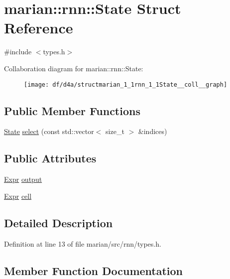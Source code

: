 \hypertarget{structmarian_1_1rnn_1_1State}{}\section{marian\+:\+:rnn\+:\+:State Struct Reference}
\label{structmarian_1_1rnn_1_1State}


{\ttfamily \#include $<$types.\+h$>$}



Collaboration diagram for marian\+:\+:rnn\+:\+:State\+:
\nopagebreak
\begin{figure}[H]
\begin{center}
\leavevmode
\texttt{[image: df/d4a/structmarian\_1\_1rnn\_1\_1State\_\_coll\_\_graph]}
\end{center}
\end{figure}
\subsection*{Public Member Functions}
\begin{DoxyCompactItemize}
\item 
\hyperlink{structmarian_1_1rnn_1_1State}{State} \hyperlink{structmarian_1_1rnn_1_1State_a8ec95a2be079d859761e58cb46c4d6c8}{select} (const std\+::vector$<$ size\+\_\+t $>$ \&indices)
\end{DoxyCompactItemize}
\subsection*{Public Attributes}
\begin{DoxyCompactItemize}
\item 
\hyperlink{namespacemarian_a498d8baf75b754011078b890b39c8e12}{Expr} \hyperlink{structmarian_1_1rnn_1_1State_a299c1c1383dbccf829d7768d046fee83}{output}
\item 
\hyperlink{namespacemarian_a498d8baf75b754011078b890b39c8e12}{Expr} \hyperlink{structmarian_1_1rnn_1_1State_a4afb5d8340bcb9afd2a5de80b2771aba}{cell}
\end{DoxyCompactItemize}


\subsection{Detailed Description}


Definition at line 13 of file marian/src/rnn/types.\+h.



\subsection{Member Function Documentation}
